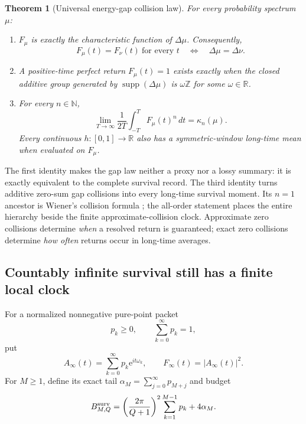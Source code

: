 \documentclass[10pt]{article}
\newtheorem{theorem}{Theorem}
\theoremstyle{definition}
\newcommand{\R}{\mathbb R}
\newcommand{\N}{\mathbb N}
\newcommand{\ee}{\mathrm e}
\begin{document}
\begin{theorem}[Universal energy-gap collision law]
\label{thm:collision}
For every probability spectrum \(\mu\):
\begin{enumerate}[leftmargin=2.2em,label=(\roman*)]
 \item \(F_\mu\) is exactly the characteristic function of
 \(\Delta\mu\). Consequently,
 \[
  F_\mu(t)=F_\nu(t)\ \text{for every }t
  \quad\Longleftrightarrow\quad
  \Delta\mu=\Delta\nu .
 \]
 \item A positive-time perfect return \(F_\mu(t)=1\) exists exactly when
 the closed additive group generated by
 \(\operatorname{supp}(\Delta\mu)\) is \(\omega\mathbb Z\) for some
 \(\omega\in\R\).
 \item For every \(n\in\N\),
 \begin{equation}
  \lim_{T\to\infty}\frac1{2T}
    \int_{-T}^{T}F_\mu(t)^n\,dt
  =\kappa_n(\mu).
  \label{eq:collision-law}
 \end{equation}
 Every continuous \(h:[0,1]\to\R\) also has a symmetric-window
 long-time mean when evaluated on \(F_\mu\).
\end{enumerate}
\end{theorem}

The first identity makes the gap law neither a proxy nor a lossy summary:
it is exactly equivalent to the complete survival record. The third identity
turns additive zero-sum gap collisions into every long-time survival moment.
Its \(n=1\) ancestor is Wiener's collision formula \cite{Wiener1933}; the
all-order statement places the entire hierarchy beside the finite
approximate-collision clock. Approximate zero collisions determine
\emph{when} a resolved return is guaranteed; exact zero collisions determine
\emph{how often} returns occur in long-time averages.

\subsection*{Countably infinite survival still has a finite local clock}

For a normalized nonnegative pure-point packet
\[
 p_k\ge0,\qquad \sum_{k=0}^{\infty}p_k=1,
\]
put
\[
 A_\infty(t)=\sum_{k=0}^{\infty}p_k\ee^{it\omega_k},
 \qquad F_\infty(t)=|A_\infty(t)|^2.
\]
For \(M\ge1\), define its exact tail
\(\alpha_M=\sum_{j=0}^{\infty}p_{M+j}\) and budget
\begin{equation}
 B^{\rm surv}_{M,Q}=
 \left(\frac{2\pi}{Q+1}\right)^2
   \sum_{k=1}^{M-1}p_k+4\alpha_M.
 \label{eq:infinite-budget}
\end{equation}
\end{document}
